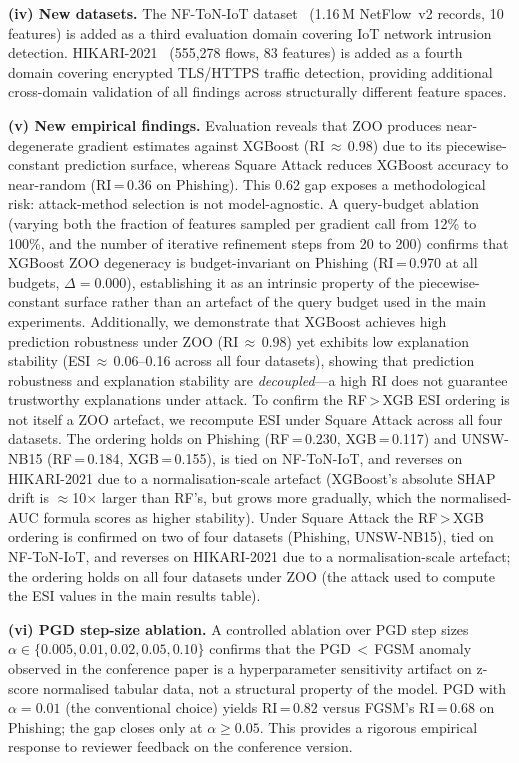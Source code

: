 \documentclass[12pt]{article}
\begin{document}
\textbf{(iv) New datasets.}
The NF-ToN-IoT dataset~\cite{sarhan2021nftoniot} (1.16\,M NetFlow~v2 records,
10 features) is added as a third evaluation domain covering IoT network intrusion
detection.  HIKARI-2021~\cite{ferrag2022hikari} (555{,}278 flows, 83 features)
is added as a fourth domain covering encrypted TLS/HTTPS traffic detection,
providing additional cross-domain validation of all findings across structurally
different feature spaces.

\textbf{(v) New empirical findings.}
Evaluation reveals that ZOO produces near-degenerate gradient estimates against
XGBoost (RI\,$\approx$\,0.98) due to its piecewise-constant prediction surface,
whereas Square Attack reduces XGBoost accuracy to near-random (RI\,=\,0.36 on
Phishing).  This 0.62 gap exposes a methodological risk: attack-method selection
is not model-agnostic.  A query-budget ablation (varying both the fraction of
features sampled per gradient call from 12\% to 100\%, and the number of
iterative refinement steps from 20 to 200) confirms that XGBoost ZOO degeneracy
is budget-invariant on Phishing (RI\,=\,0.970 at all budgets, $\Delta=0.000$),
establishing it as an intrinsic property of the piecewise-constant surface
rather than an artefact of the query budget used in the main experiments.  Additionally, we demonstrate that XGBoost achieves high
prediction robustness under ZOO (RI\,$\approx$\,0.98) yet exhibits low explanation
stability (ESI\,$\approx$\,0.06--0.16 across all four datasets), showing that prediction
robustness and explanation stability are \emph{decoupled}---a high RI does not
guarantee trustworthy explanations under attack.  To confirm the RF\,>\,XGB ESI ordering is not itself a ZOO artefact, we recompute
ESI under Square Attack across all four datasets.  The ordering holds on Phishing
(RF\,=\,0.230, XGB\,=\,0.117) and UNSW-NB15 (RF\,=\,0.184, XGB\,=\,0.155), is
tied on NF-ToN-IoT, and reverses on HIKARI-2021 due to a normalisation-scale
artefact (XGBoost's absolute SHAP drift is $\approx$10$\times$ larger than RF's,
but grows more gradually, which the normalised-AUC formula scores as higher
stability).  Under Square Attack the RF\,>\,XGB ordering is confirmed on two of four datasets
(Phishing, UNSW-NB15), tied on NF-ToN-IoT, and reverses on HIKARI-2021 due to a
normalisation-scale artefact; the ordering holds on all four datasets under ZOO
(the attack used to compute the ESI values in the main results table).

\textbf{(vi) PGD step-size ablation.}
A controlled ablation over PGD step sizes $\alpha \in \{0.005, 0.01, 0.02, 0.05,
0.10\}$ confirms that the PGD\,$<$\,FGSM anomaly observed in the conference paper
is a hyperparameter sensitivity artifact on z-score normalised tabular data, not a
structural property of the model.  PGD with $\alpha=0.01$ (the conventional choice)
yields RI\,=\,0.82 versus FGSM's RI\,=\,0.68 on Phishing; the gap closes only at
$\alpha \geq 0.05$.  This provides a rigorous empirical response to reviewer
feedback on the conference version.
\end{document}
